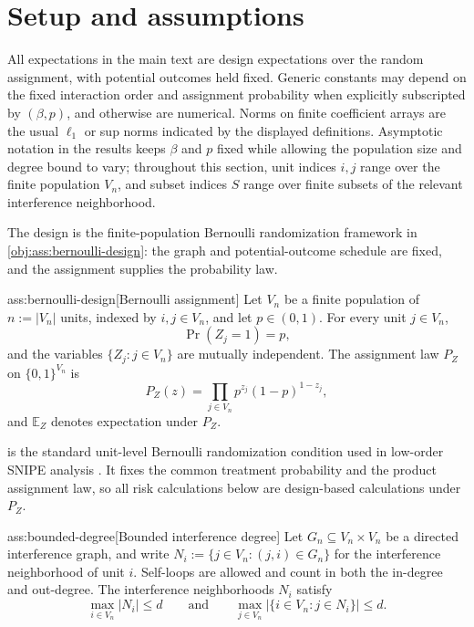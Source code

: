 \section{Setup and assumptions}

All expectations in the main text are design expectations over the random assignment, with potential outcomes held fixed. Generic constants may depend on the fixed interaction order and assignment probability when explicitly subscripted by \((\beta,p)\), and otherwise are numerical. Norms on finite coefficient arrays are the usual \(\ell_1\) or sup norms indicated by the displayed definitions. Asymptotic notation in the results keeps \(\beta\) and \(p\) fixed while allowing the population size and degree bound to vary; throughout this section, unit indices \(i,j\) range over the finite population \(V_n\), and subset indices \(S\) range over finite subsets of the relevant interference neighborhood.

The design is the finite-population Bernoulli randomization framework in \cref{obj:ass:bernoulli-design}: the graph and potential-outcome schedule are fixed, and the assignment supplies the probability law.

\begin{assumptionv}{ass:bernoulli-design}[Bernoulli assignment]
Let \(V_n\) be a finite population of \(n:=|V_n|\) units, indexed by \(i,j\in V_n\), and let \(p\in(0,1)\). For every unit \(j\in V_n\),
\[
\Pr(Z_j=1)=p,
\]
and the variables \(\{Z_j:j\in V_n\}\) are mutually independent. The assignment law \(P_Z\) on \(\{0,1\}^{V_n}\) is
\[
P_Z(z)
=
\prod_{j\in V_n} p^{z_j}(1-p)^{1-z_j},
\]
and \(\mathbb E_Z\) denotes expectation under \(P_Z\).
\end{assumptionv}

 is the standard unit-level Bernoulli randomization condition used in low-order SNIPE analysis \citep{CortezRodriguezEichhornYu2023}. It fixes the common treatment probability and the product assignment law, so all risk calculations below are design-based calculations under \(P_Z\).

\begin{assumptionv}{ass:bounded-degree}[Bounded interference degree]
Let \(G_n\subseteq V_n\times V_n\) be a directed interference graph, and write \(N_i:=\{j\in V_n:(j,i)\in G_n\}\) for the interference neighborhood of unit \(i\). Self-loops are allowed and count in both the in-degree and out-degree. The interference neighborhoods \(N_i\) satisfy
\[
\max_{i\in V_n}|N_i|\le d
\qquad\text{and}\qquad
\max_{j\in V_n}\bigl|\{i\in V_n:j\in N_i\}\bigr|\le d .
\]
\end{assumptionv}

